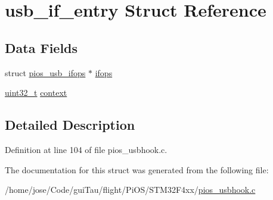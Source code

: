 \hypertarget{structusb__if__entry}{\section{usb\-\_\-if\-\_\-entry Struct Reference}
\label{structusb__if__entry}
}
\subsection*{Data Fields}
\begin{DoxyCompactItemize}
\item 
struct \hyperlink{structpios__usb__ifops}{pios\-\_\-usb\-\_\-ifops} $\ast$ \hyperlink{group___p_i_o_s___u_s_b_h_o_o_k_ga8c6a8d1a868734fd250c8af665a54c3c}{ifops}
\item 
\hyperlink{stdint_8h_a435d1572bf3f880d55459d9805097f62}{uint32\-\_\-t} \hyperlink{group___p_i_o_s___u_s_b_h_o_o_k_gad9a6d740530f937ee0fd2870b5c02ce8}{context}
\end{DoxyCompactItemize}


\subsection{Detailed Description}


Definition at line 104 of file pios\-\_\-usbhook.\-c.



The documentation for this struct was generated from the following file\-:\begin{DoxyCompactItemize}
\item 
/home/jose/\-Code/gui\-Tau/flight/\-Pi\-O\-S/\-S\-T\-M32\-F4xx/\hyperlink{_s_t_m32_f4xx_2pios__usbhook_8c}{pios\-\_\-usbhook.\-c}\end{DoxyCompactItemize}
